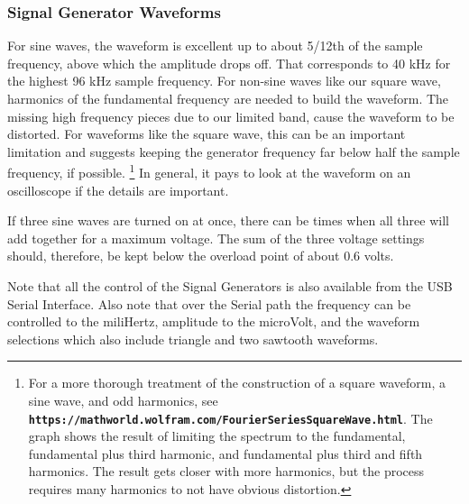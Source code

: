 \subsubsection{Signal Generator Waveforms}
\label{subsect:ASGWaveforms}
For sine waves, the waveform is excellent up to about 5/12th of the sample frequency, above which the amplitude drops off.   That corresponds to 40 kHz for the highest 96 kHz sample frequency.  For non-sine waves like our square wave, harmonics of the fundamental frequency are needed to build the waveform.  The missing high frequency pieces due to our limited band, cause the waveform to be distorted.  For waveforms like the square wave, this can be an important limitation and suggests keeping the generator frequency far below half the sample frequency, if possible. \footnote{For a more thorough treatment of the construction of a square waveform, a sine wave, and odd harmonics, see \textbf{\texttt{https://mathworld.wolfram.com/FourierSeriesSquareWave.html}}. \linebreak  The graph shows the result of limiting the spectrum to the fundamental, fundamental plus third harmonic, and fundamental plus third and  fifth harmonics.  The result gets closer with more harmonics, but the process requires many harmonics to not have obvious distortion. }
%
 In general, it pays to look at the waveform on an oscilloscope if the details are important.

If three sine waves are turned on at once, there can be times when all three will add together for a maximum voltage.  The sum of the three voltage settings should, therefore, be kept below the overload point of about 0.6 volts.

Note that all the control of the Signal Generators is also available from the USB Serial Interface.  Also note that over the Serial path the frequency can be controlled to the miliHertz, amplitude to the microVolt, and the waveform selections which also include triangle and two sawtooth waveforms.

